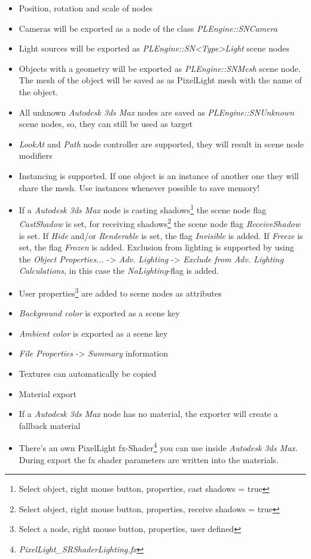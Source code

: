 \begin{itemize}
\item{Position, rotation and scale of nodes}
\item{Cameras will be exported as a node of the class \emph{PLEngine::SNCamera}}
\item{Light sources will be exported as \emph{PLEngine::SN<Type>Light} scene nodes}
\item{Objects with a geometry will be exported as \emph{PLEngine::SNMesh} scene node. The mesh of the object will be saved as as PixelLight mesh with the name of the object.}
\item{All unknown \emph{Autodesk 3ds Max} nodes are saved as \emph{PLEngine::SNUnknown} scene nodes, so, they can still be used as target}
\item{\emph{LookAt} and \emph{Path} node controller are supported, they will result in scene node modifiers}
\item{Instancing is supported. If one object is an instance of another one they will share the mesh. Use instances whenever possible to save memory!}
\item{If a \emph{Autodesk 3ds Max} node is casting shadows\footnote{Select object, right mouse button, properties, cast shadows = true} the scene node flag \emph{CastShadow} is set, for receiving shadows\footnote{Select object, right mouse button, properties, receive shadows = true} the scene node flag \emph{ReceiveShadow} is set. If \emph{Hide} and/or \emph{Renderable} is set, the flag \emph{Invisible} is added. If \emph{Freeze} is set, the flag \emph{Frozen} is added. Exclusion from lighting is supported by using the \emph{Object Properties...} -> \emph{Adv. Lighting} -> \emph{Exclude from Adv. Lighting Calculations}, in this case the \emph{NoLighting}-flag is added.}
\item{User properties\footnote{Select a node, right mouse button, properties, user defined} are added to scene nodes as attributes}
\item{\emph{Background color} is exported as a scene key}
\item{\emph{Ambient color} is exported as a scene key}
\item{\emph{File Properties} -> \emph{Summary} information}
\item{Textures can automatically be copied}
\item{Material export}
\item{If a \emph{Autodesk 3ds Max} node has no material, the exporter will create a fallback material}
\item{There's an own PixelLight fx-Shader\footnote{\emph{PixelLight\_SRShaderLighting.fx}} you can use inside \emph{Autodesk 3ds Max}. During export the fx shader parameters are written into the materials.}

\end{itemize}
